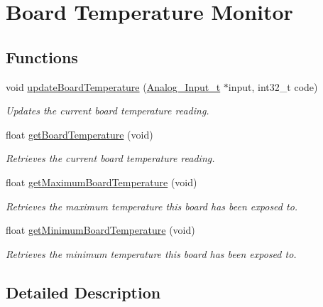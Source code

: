 \hypertarget{group__board__temperature}{\section{Board Temperature Monitor}
\label{group__board__temperature}
}
\subsection*{Functions}
\begin{DoxyCompactItemize}
\item 
void \hyperlink{group__board__temperature_ga836b49ee7ee49ad9e13dc50a80fa7a0a}{update\-Board\-Temperature} (\hyperlink{struct_analog___input__t}{Analog\-\_\-\-Input\-\_\-t} $\ast$input, int32\-\_\-t code)
\begin{DoxyCompactList}\small\item\em Updates the current board temperature reading. \end{DoxyCompactList}\item 
float \hyperlink{group__board__temperature_ga84f2a5a76c0781a00449e4e71a8db0bc}{get\-Board\-Temperature} (void)
\begin{DoxyCompactList}\small\item\em Retrieves the current board temperature reading. \end{DoxyCompactList}\item 
float \hyperlink{group__board__temperature_gabd8a85a7dd96f5aa9826e7a0999f738c}{get\-Maximum\-Board\-Temperature} (void)
\begin{DoxyCompactList}\small\item\em Retrieves the maximum temperature this board has been exposed to. \end{DoxyCompactList}\item 
float \hyperlink{group__board__temperature_ga2e1ba0973955b1358d76f0da459a36e2}{get\-Minimum\-Board\-Temperature} (void)
\begin{DoxyCompactList}\small\item\em Retrieves the minimum temperature this board has been exposed to. \end{DoxyCompactList}\end{DoxyCompactItemize}


\subsection{Detailed Description}


